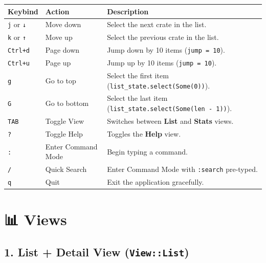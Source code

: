 \documentclass[
  letterpaper,
  DIV=11,
  numbers=noendperiod]{scrreprt}
\begin{document}
\begin{longtable}[]{@{}
  >{\raggedright\arraybackslash}p{}
  >{\raggedright\arraybackslash}p{}
  >{\raggedright\arraybackslash}p{}@{}}
\toprule\noalign{}
\begin{minipage}[b]{\linewidth}\raggedright
Keybind
\end{minipage} & \begin{minipage}[b]{\linewidth}\raggedright
Action
\end{minipage} & \begin{minipage}[b]{\linewidth}\raggedright
Description
\end{minipage} \\
\midrule\noalign{}
\endhead
\bottomrule\noalign{}
\endlastfoot
\texttt{j} or \texttt{↓} & Move down & Select the next crate in the
list. \\
\texttt{k} or \texttt{↑} & Move up & Select the previous crate in the
list. \\
\texttt{Ctrl+d} & Page down & Jump down by 10 items
(\texttt{jump\ =\ 10}). \\
\texttt{Ctrl+u} & Page up & Jump up by 10 items
(\texttt{jump\ =\ 10}). \\
\texttt{g} & Go to top & Select the first item
(\texttt{list\_state.select(Some(0))}). \\
\texttt{G} & Go to bottom & Select the last item
(\texttt{list\_state.select(Some(len\ -\ 1))}). \\
\texttt{TAB} & Toggle View & Switches between \textbf{List} and
\textbf{Stats} views. \\
\texttt{?} & Toggle Help & Toggles the \textbf{Help} view. \\
\texttt{:} & Enter Command Mode & Begin typing a command. \\
\texttt{/} & Quick Search & Enter Command Mode with \texttt{:search}
pre-typed. \\
\texttt{q} & Quit & Exit the application gracefully. \\
\end{longtable}

\section{📊 Views}\label{views}

\subsection{\texorpdfstring{1. List + Detail View
(\texttt{View::List})}{1. List + Detail View (View::List)}}\label{list-detail-view-viewlist}
\end{document}
